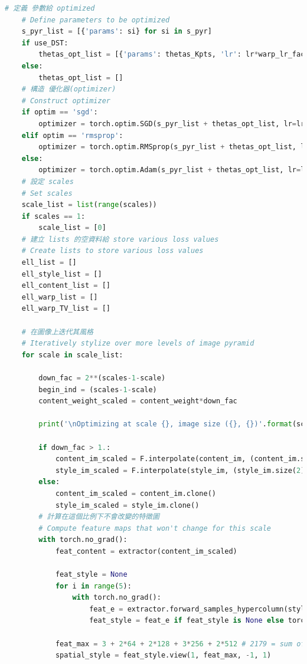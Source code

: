 \documentclass[10pt,UTF8]{ctexart}
\begin{document}
\begin{lstlisting}[language={python}]
    # 定義 參數給 optimized
    # Define parameters to be optimized
    s_pyr_list = [{'params': si} for si in s_pyr]
    if use_DST:
        thetas_opt_list = [{'params': thetas_Kpts, 'lr': lr*warp_lr_fac}]
    else:
        thetas_opt_list = []
    # 構造 優化器(optimizer)
    # Construct optimizer
    if optim == 'sgd':
        optimizer = torch.optim.SGD(s_pyr_list + thetas_opt_list, lr=lr, momentum=0.9)
    elif optim == 'rmsprop':
        optimizer = torch.optim.RMSprop(s_pyr_list + thetas_opt_list, lr=lr)
    else:
        optimizer = torch.optim.Adam(s_pyr_list + thetas_opt_list, lr=lr)
    # 設定 scales
    # Set scales
    scale_list = list(range(scales))
    if scales == 1:
        scale_list = [0]
    # 建立 lists 的空資料給 store various loss values
    # Create lists to store various loss values
    ell_list = []
    ell_style_list = []
    ell_content_list = []
    ell_warp_list = []
    ell_warp_TV_list = []

    # 在圖像上迭代其風格
    # Iteratively stylize over more levels of image pyramid
    for scale in scale_list:

        down_fac = 2**(scales-1-scale)
        begin_ind = (scales-1-scale)
        content_weight_scaled = content_weight*down_fac

        print('\nOptimizing at scale {}, image size ({}, {})'.format(scale+1, content_im.size(2)//down_fac, content_im.size(3)//down_fac))

        if down_fac > 1.:
            content_im_scaled = F.interpolate(content_im, (content_im.size(2)//down_fac, content_im.size(3)//down_fac), mode='bilinear')
            style_im_scaled = F.interpolate(style_im, (style_im.size(2)//down_fac, style_im.size(3)//down_fac), mode='bilinear')
        else:
            content_im_scaled = content_im.clone()
            style_im_scaled = style_im.clone()
        # 計算在這個比例下不會改變的特徵圖
        # Compute feature maps that won't change for this scale
        with torch.no_grad():
            feat_content = extractor(content_im_scaled)

            feat_style = None
            for i in range(5):
                with torch.no_grad():
                    feat_e = extractor.forward_samples_hypercolumn(style_im_scaled, samps=1000)
                    feat_style = feat_e if feat_style is None else torch.cat((feat_style, feat_e), dim=2)

            feat_max = 3 + 2*64 + 2*128 + 3*256 + 2*512 # 2179 = sum of all extracted channels
            spatial_style = feat_style.view(1, feat_max, -1, 1)


\end{lstlisting}
\end{document}
